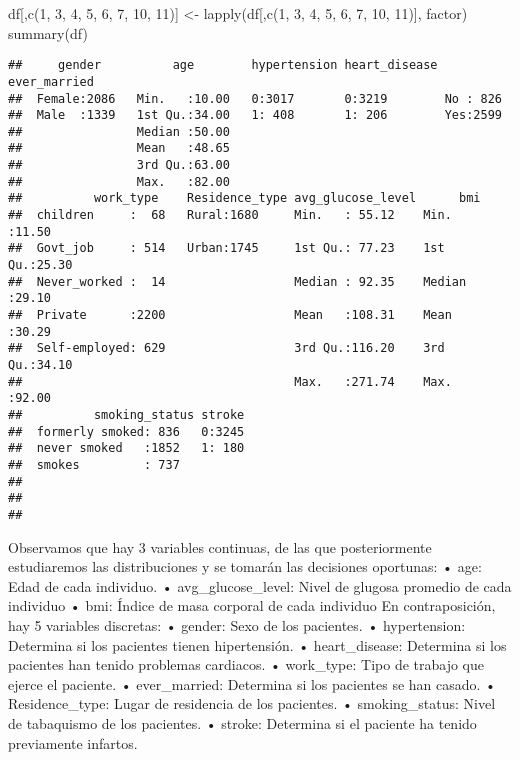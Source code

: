 \documentclass[
]{article}
\newenvironment{Shaded}{\begin{snugshade}}{\end{snugshade}}
\newcommand{\DecValTok}[1]{\textcolor[rgb]{0.00,0.00,0.81}{#1}}
\newcommand{\FunctionTok}[1]{\textcolor[rgb]{0.00,0.00,0.00}{#1}}
\newcommand{\NormalTok}[1]{#1}
\newcommand{\OtherTok}[1]{\textcolor[rgb]{0.56,0.35,0.01}{#1}}
\begin{document}
\begin{Shaded}
\begin{Highlighting}[]
\NormalTok{df[,}\FunctionTok{c}\NormalTok{(}\DecValTok{1}\NormalTok{, }\DecValTok{3}\NormalTok{, }\DecValTok{4}\NormalTok{, }\DecValTok{5}\NormalTok{, }\DecValTok{6}\NormalTok{, }\DecValTok{7}\NormalTok{, }\DecValTok{10}\NormalTok{, }\DecValTok{11}\NormalTok{)] }\OtherTok{\textless{}{-}} \FunctionTok{lapply}\NormalTok{(df[,}\FunctionTok{c}\NormalTok{(}\DecValTok{1}\NormalTok{, }\DecValTok{3}\NormalTok{, }\DecValTok{4}\NormalTok{, }\DecValTok{5}\NormalTok{, }\DecValTok{6}\NormalTok{, }\DecValTok{7}\NormalTok{, }\DecValTok{10}\NormalTok{, }\DecValTok{11}\NormalTok{)], factor)}
\FunctionTok{summary}\NormalTok{(df)}
\end{Highlighting}
\end{Shaded}

\begin{verbatim}
##     gender          age        hypertension heart_disease ever_married
##  Female:2086   Min.   :10.00   0:3017       0:3219        No : 826    
##  Male  :1339   1st Qu.:34.00   1: 408       1: 206        Yes:2599    
##                Median :50.00                                          
##                Mean   :48.65                                          
##                3rd Qu.:63.00                                          
##                Max.   :82.00                                          
##          work_type    Residence_type avg_glucose_level      bmi       
##  children     :  68   Rural:1680     Min.   : 55.12    Min.   :11.50  
##  Govt_job     : 514   Urban:1745     1st Qu.: 77.23    1st Qu.:25.30  
##  Never_worked :  14                  Median : 92.35    Median :29.10  
##  Private      :2200                  Mean   :108.31    Mean   :30.29  
##  Self-employed: 629                  3rd Qu.:116.20    3rd Qu.:34.10  
##                                      Max.   :271.74    Max.   :92.00  
##          smoking_status stroke  
##  formerly smoked: 836   0:3245  
##  never smoked   :1852   1: 180  
##  smokes         : 737           
##                                 
##                                 
## 
\end{verbatim}

Observamos que hay 3 variables continuas, de las que posteriormente
estudiaremos las distribuciones y se tomarán las decisiones oportunas: •
age: Edad de cada individuo. • avg\_glucose\_level: Nivel de glugosa
promedio de cada individuo • bmi: Índice de masa corporal de cada
individuo En contraposición, hay 5 variables discretas: • gender: Sexo
de los pacientes. • hypertension: Determina si los pacientes tienen
hipertensión. • heart\_disease: Determina si los pacientes han tenido
problemas cardiacos. • work\_type: Tipo de trabajo que ejerce el
paciente. • ever\_married: Determina si los pacientes se han casado. •
Residence\_type: Lugar de residencia de los pacientes. •
smoking\_status: Nivel de tabaquismo de los pacientes. • stroke:
Determina si el paciente ha tenido previamente infartos.
\end{document}
